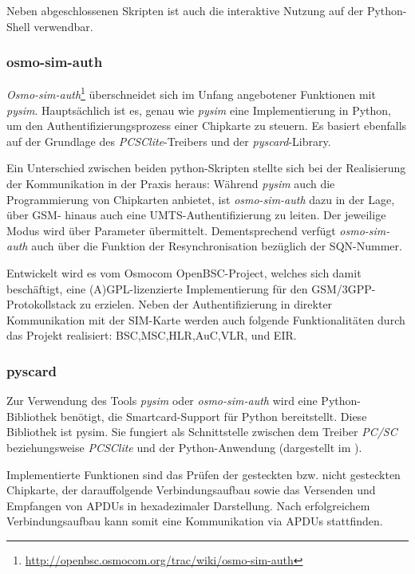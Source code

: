 Neben abgeschlossenen Skripten ist auch die interaktive Nutzung auf der
Python-Shell verwendbar.

\subsubsection[osmo-sim-auth (Schenkel)]{osmo-sim-auth}
\label{subsec:osmosim}
\textit{Osmo-sim-auth}\footnote{\url{http://openbsc.osmocom.org/trac/wiki/osmo-sim-auth}}
überschneidet sich im Unfang angebotener Funktionen mit \textit{pysim}. Hauptsächlich ist es,
genau wie \textit{pysim} eine Implementierung in Python, um den Authentifizierungsprozess
einer Chipkarte zu steuern. Es basiert ebenfalls auf der Grundlage des
\textit{PCSClite}-Treibers und der \textit{pyscard}-Library.

Ein Unterschied zwischen beiden python-Skripten stellte sich bei der
Realisierung der Kommunikation in der Praxis heraus:
Während \textit{pysim} auch die Programmierung von Chipkarten anbietet, ist
\textit{osmo-sim-auth} dazu in der Lage, über \ac{GSM}- hinaus auch
eine \ac{UMTS}-Authentifizierung zu leiten.
Der jeweilige Modus wird über Parameter übermittelt.
Dementsprechend verfügt \textit{osmo-sim-auth} auch über die Funktion der
Resynchronisation bezüglich der \ac{SQN}-Nummer\cite{osmosimweb}.

Entwickelt wird es vom Osmocom OpenBSC-Project, welches sich damit
beschäftigt, eine (A)GPL-lizenzierte Implementierung für den
GSM/3GPP-Protokollstack zu erzielen. Neben der Authentifizierung
in direkter Kommunikation mit der SIM-Karte werden auch folgende
Funktionalitäten durch das Projekt realisiert:
\ac{BSC},\ac{MSC},\ac{HLR},\ac{AuC},\ac{VLR}, und \ac{EIR}\cite{osmocombscweb}.

\subsubsection[pyscard (Schenkel)]{pyscard}
\label{pyscard}
Zur Verwendung des Tools \textit{pysim} oder \textit{osmo-sim-auth} wird eine Python-Bibliothek benötigt,
die Smartcard-Support für Python bereitstellt. Diese Bibliothek
ist pysim. Sie fungiert als Schnittstelle zwischen dem Treiber \textit{PC/SC}
beziehungsweise \textit{PCSClite} und der Python-Anwendung 
(dargestellt im ).

Implementierte Funktionen sind das Prüfen der gesteckten bzw. nicht gesteckten
Chipkarte, der darauffolgende Verbindungsaufbau sowie das Versenden und
Empfangen von APDUs in hexadezimaler Darstellung.
Nach erfolgreichem Verbindungsaufbau kann somit eine Kommunikation via
APDUs stattfinden.

